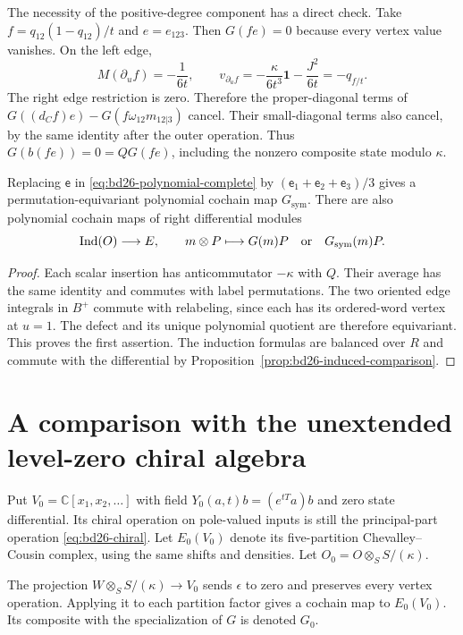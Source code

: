 The necessity of the positive-degree component has a direct check.
Take $f=q_{12}(1-q_{12})/t$ and $e=e_{123}$.
Then $G(fe)=0$ because every vertex value vanishes.
On the left edge,
\[
 M(\partial_uf)=-\frac1{6t},\qquad
 v_{\partial_uf}=-\frac\kappa{6t^3}\mathbf1-\frac{J^2}{6t}
 =-q_{f/t}.
\]
The right edge restriction is zero.
Therefore the proper-diagonal terms of
$G((d_Cf)e)-G(f\omega_{12}m_{12|3})$ cancel.
Their small-diagonal terms also cancel, by the same identity after the outer operation.
Thus $G(b(fe))=0=QG(fe)$, including the nonzero composite state modulo $\kappa$.

\begin{corollary}\label{cor:bd26-polynomial-equivariant}
Replacing $\mathsf e$ in \eqref{eq:bd26-polynomial-complete} by
$(\mathsf e_1+\mathsf e_2+\mathsf e_3)/3$ gives a permutation-equivariant polynomial cochain map $G_{\mathrm{sym}}$.
There are also polynomial cochain maps of right differential modules
\[
 \operatorname{Ind}(O)\longrightarrow E,
 \qquad m\otimes P\longmapsto G(m)P
 \quad\hbox{or}\quad G_{\mathrm{sym}}(m)P.
\]
\end{corollary}
\begin{proof}
Each scalar insertion has anticommutator $-\kappa$ with $Q$.
Their average has the same identity and commutes with label permutations.
The two oriented edge integrals in $B^+$ commute with relabeling, since each has its ordered-word vertex at $u=1$.
The defect and its unique polynomial quotient are therefore equivariant.
This proves the first assertion.
The induction formulas are balanced over $R$ and commute with the differential by Proposition~\ref{prop:bd26-induced-comparison}.
\end{proof}

\section{A comparison with the unextended level-zero chiral algebra}

Put $V_0=\mathbb C[x_1,x_2,\ldots]$ with field
$Y_0(a,t)b=(e^{tT}a)b$ and zero state differential.
Its chiral operation on pole-valued inputs is still the principal-part operation \eqref{eq:bd26-chiral}.
Let $E_0(V_0)$ denote its five-partition Chevalley--Cousin complex, using the same shifts and densities.
Let $O_0=O\otimes_S S/(\kappa)$.

The projection $W\otimes_S S/(\kappa)\to V_0$ sends $\epsilon$ to zero and preserves every vertex operation.
Applying it to each partition factor gives a cochain map to $E_0(V_0)$.
Its composite with the specialization of $G$ is denoted $G_0$.

